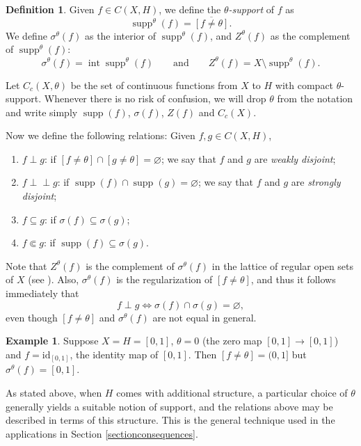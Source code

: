 \documentclass[letter,11pt]{amsart}
\theoremstyle{plain}		\newtheorem{theorem}[generalnumbering]{Theorem}
\theoremstyle{plain}		\newtheorem{corollary}[generalnumbering]{Corollary}
\theoremstyle{definition}		\newtheorem{definition}[generalnumbering]{Definition}
\theoremstyle{definition}		\newtheorem{example}[generalnumbering]{Example}
\theoremstyle{plain}		\newtheorem{proposition}[generalnumbering]{Proposition}
\theoremstyle{plain}		\newtheorem{lemma}[generalnumbering]{Lemma}
\theoremstyle{plain}    \newtheorem{plainstyle}[generalnumbering]{\namefordifferentenvironment}
\theoremstyle{plain}    \newtheorem*{plainstyle*}{\namefordifferentenvironment}
\theoremstyle{definition}    \newtheorem{definitionstyle}[generalnumbering]{\namefordifferentenvironment}
\theoremstyle{definition}    \newtheorem*{definitionstyle*}{\namefordifferentenvironment}
\newcommand{\perpp}{\perp\!\!\!\perp}
\DeclareMathOperator{\supp}{supp}
\newcommand{\id}{\mathrm{id}}
\begin{document}
\begin{definition}\label{definitionsigma}
	Given $f\in C(X,H)$, we define the \emph{$\theta$-support} of $f$ as
	\[\supp^\theta(f)=\overline{[f\neq\theta]}.\]
	We define $\sigma^\theta(f)$ as the interior of $\supp^\theta(f)$, and $Z^\theta(f)$ as the complement of $\supp^\theta(f)$:
	\[\sigma^\theta(f)=\operatorname{int}\supp^\theta(f)\qquad\text{and}\qquad Z^\theta(f)=X\setminus\supp^\theta(f).\]
	
	Let $C_c(X,\theta)$ be the set of continuous functions from $X$ to $H$ with compact $\theta$-support. Whenever there is no risk of confusion, we will drop $\theta$ from the notation and write simply $\supp(f)$, $\sigma(f)$, $Z(f)$ and $C_c(X)$.
	
	Now we define the following relations: Given $f,g\in C(X,H)$,
	\begin{enumerate}[label=(\arabic*)]
		\item $f\perp g$: if $[f\neq\theta]\cap[g\neq\theta]=\varnothing$; we say that $f$ and $g$ are \emph{weakly disjoint};
		\item $f\perpp g$: if $\supp(f)\cap\supp(g)=\varnothing$; we say that $f$ and $g$ are \emph{strongly disjoint};
		\item $f\subseteq g$: if $\sigma(f)\subseteq\sigma(g)$;
		\item $f\Subset g$: if $\supp(f)\subseteq\sigma(g)$.
	\end{enumerate}
\end{definition}

Note that $Z^\theta(f)$ is the complement of $\sigma^\theta(f)$ in the lattice of regular open sets of $X$ (see \cite[Chapter 10]{MR2466574}). Also, $\sigma^\theta(f)$ is the regularization of $[f\neq\theta]$, and thus it follows immediately that
\[f\perp g\iff \sigma(f)\cap\sigma(g)=\varnothing,\]
even though $[f\neq \theta]$ and $\sigma^\theta(f)$ are not equal in general.

\begin{example}
	Suppose $X=H=[0,1]$, $\theta=0$ (the zero map $[0,1]\to[0,1]$) and $f=\id_{[0,1]}$, the identity map of $[0,1]$. Then $[f\neq\theta]=(0,1]$ but $\sigma^\theta(f)=[0,1]$.
\end{example}

As stated above, when $H$ comes with additional structure, a particular choice of $\theta$ generally yields a suitable notion of support, and the relations above may be described in terms of this structure. This is the general technique used in the  applications in Section \ref{sectionconsequences}.
\end{document}
